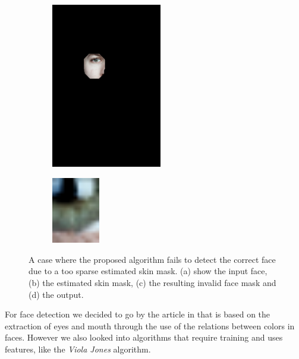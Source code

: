 \begin{figure}[H]
\begin{subfigure}{.25\textwidth}
  \caption{}
\end{subfigure}%
\begin{subfigure}{.25\textwidth}
  \centering
  \includegraphics[width=0.53\textwidth]{img/fd3/fail2_faceImage.png}
  \caption{}
\end{subfigure}%
\begin{subfigure}{.25\textwidth}
  \centering
  \includegraphics[width=0.23\textwidth]{img/fd3/fail2_output.png}
  \caption{}
\end{subfigure}%

\caption{A case where the proposed algorithm fails to detect the correct face due to a too sparse estimated skin mask. (a) show the input face, (b) the estimated skin mask, (c) the resulting invalid face mask and (d) the output.}
\label{fig:fail2}
\end{figure}

For face detection we decided to go by the article in \cite{fdInColorImages} that is based on the extraction of eyes and mouth through the use of the relations between colors in faces. However we also looked into algorithms that require training and uses features, like the \textit{Viola Jones} \cite{viola} algorithm.

